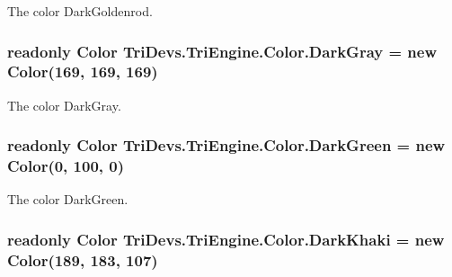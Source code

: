 The color Dark\-Goldenrod. 

\hypertarget{struct_tri_devs_1_1_tri_engine_1_1_color_a038b2a2ecee6a8a72d90442ae426a522}{
\subsubsection[{Dark\-Gray}]{\setlength{\rightskip}{0pt plus 5cm}readonly {\bf Color} Tri\-Devs.\-Tri\-Engine.\-Color.\-Dark\-Gray = new {\bf Color}(169, 169, 169)\hspace{0.3cm}{\ttfamily [static]}}}\label{struct_tri_devs_1_1_tri_engine_1_1_color_a038b2a2ecee6a8a72d90442ae426a522}


The color Dark\-Gray. 

\hypertarget{struct_tri_devs_1_1_tri_engine_1_1_color_a26a8cd82f97793d30d5fb682b85d59a3}{
\subsubsection[{Dark\-Green}]{\setlength{\rightskip}{0pt plus 5cm}readonly {\bf Color} Tri\-Devs.\-Tri\-Engine.\-Color.\-Dark\-Green = new {\bf Color}(0, 100, 0)\hspace{0.3cm}{\ttfamily [static]}}}\label{struct_tri_devs_1_1_tri_engine_1_1_color_a26a8cd82f97793d30d5fb682b85d59a3}


The color Dark\-Green. 

\hypertarget{struct_tri_devs_1_1_tri_engine_1_1_color_ad0080825ef91c84b41817b693a5406b7}{
\subsubsection[{Dark\-Khaki}]{\setlength{\rightskip}{0pt plus 5cm}readonly {\bf Color} Tri\-Devs.\-Tri\-Engine.\-Color.\-Dark\-Khaki = new {\bf Color}(189, 183, 107)\hspace{0.3cm}{\ttfamily [static]}}}\label{struct_tri_devs_1_1_tri_engine_1_1_color_ad0080825ef91c84b41817b693a5406b7}


